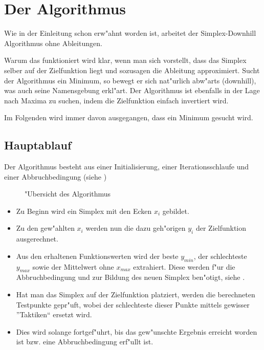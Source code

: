 \section{Der Algorithmus}

Wie in der Einleitung schon erw"ahnt worden ist, arbeitet der Simplex-Downhill
Algorithmus ohne Ableitungen.

Warum das funktioniert wird klar, wenn man sich vorstellt, dass das
Simplex selber auf der Zielfunktion liegt und sozusagen die Ableitung
approximiert. Sucht der Algorithmus ein Minimum, so bewegt er sich
nat"urlich abw"arts (downhill), was auch seine Namensgebung erkl"art.
Der Algorithmus ist ebenfalls in der Lage nach Maxima zu suchen, indem
die Zielfunktion einfach invertiert wird.

Im Folgenden wird immer davon ausgegangen, dass ein Minimum gesucht wird.

\subsection{Hauptablauf}
Der Algorithmus besteht aus einer Initialisierung, einer
Iterationsschlaufe und einer Abbruchbedingung (siehe
)

\begin{figure}[h]

\caption{"Ubersicht des Algorithmus}
\label{fig:downhillalgo1}
\end{figure}

\begin{itemize}
\item
Zu Beginn wird ein Simplex mit den Ecken $x_i$ gebildet.
\item
Zu den gew"ahlten $x_i$ werden nun die dazu geh"origen $y_i$ der
Zielfunktion ausgerechnet.
\item
Aus den erhaltenen Funktionswerten wird der beste $y_{min}$, der
schlechteste $y_{max}$ sowie der Mittelwert ohne $x_{max}$ extrahiert.
Diese werden f"ur die Abbruchbedingung 
und zur Bildung des neuen Simplex ben"otigt, siehe
.
\item
Hat man das Simplex auf der Zielfunktion platziert, werden die
berechneten
Testpunkte gepr"uft, wobei der schlechteste dieser Punkte mittels
gewisser ''Taktiken`` ersetzt wird.
\item
Dies wird solange fortgef"uhrt, bis
das gew"unschte Ergebnis erreicht worden ist bzw. eine Abbruchbedingung
erf"ullt ist.
\end{itemize}

